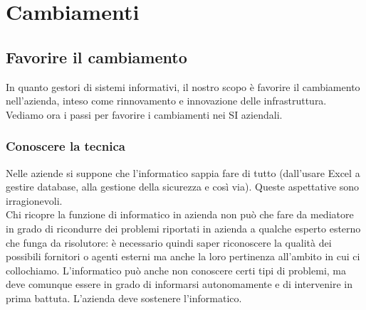 \chapter{Cambiamenti}

\section{Favorire il cambiamento}
In quanto gestori di sistemi informativi, il nostro scopo \`e favorire il cambiamento nell'azienda, inteso come rinnovamento e innovazione delle infrastruttura. Vediamo ora i passi per favorire i cambiamenti nei SI aziendali.

\subsection{Conoscere la tecnica}  Nelle aziende si suppone che l'informatico sappia fare di tutto (dall'usare Excel a gestire database, alla gestione della sicurezza e cos\`i via). Queste aspettative sono irragionevoli. \\
Chi ricopre la funzione di informatico in azienda non pu\`o che fare da mediatore in grado di ricondurre dei problemi riportati in azienda a qualche esperto esterno che funga da risolutore: \`e necessario quindi saper riconoscere la qualit\`a dei possibili fornitori o agenti esterni ma anche la loro pertinenza all'ambito in cui ci collochiamo.
L'informatico pu\`o anche non conoscere certi tipi di problemi, ma deve comunque essere in grado di informarsi autonomamente e di intervenire in prima battuta. L'azienda deve sostenere l'informatico.

